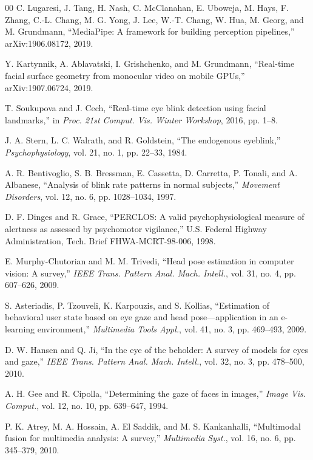 \documentclass[conference]{IEEEtran}
\begin{document}
\balance
\begin{thebibliography}{00}
 C. Lugaresi, J. Tang, H. Nash, C. McClanahan, E. Uboweja, M. Hays, F. Zhang, C.-L. Chang, M. G. Yong, J. Lee, W.-T. Chang, W. Hua, M. Georg, and M. Grundmann, ``MediaPipe: A framework for building perception pipelines,'' arXiv:1906.08172, 2019.

 Y. Kartynnik, A. Ablavatski, I. Grishchenko, and M. Grundmann, ``Real-time facial surface geometry from monocular video on mobile GPUs,'' arXiv:1907.06724, 2019.

 T. Soukupova and J. Cech, ``Real-time eye blink detection using facial landmarks,'' in \textit{Proc. 21st Comput. Vis. Winter Workshop}, 2016, pp. 1--8.

 J. A. Stern, L. C. Walrath, and R. Goldstein, ``The endogenous eyeblink,'' \textit{Psychophysiology}, vol. 21, no. 1, pp. 22--33, 1984.

 A. R. Bentivoglio, S. B. Bressman, E. Cassetta, D. Carretta, P. Tonali, and A. Albanese, ``Analysis of blink rate patterns in normal subjects,'' \textit{Movement Disorders}, vol. 12, no. 6, pp. 1028--1034, 1997.

 D. F. Dinges and R. Grace, ``PERCLOS: A valid psychophysiological measure of alertness as assessed by psychomotor vigilance,'' U.S. Federal Highway Administration, Tech. Brief FHWA-MCRT-98-006, 1998.

 E. Murphy-Chutorian and M. M. Trivedi, ``Head pose estimation in computer vision: A survey,'' \textit{IEEE Trans. Pattern Anal. Mach. Intell.}, vol. 31, no. 4, pp. 607--626, 2009.

 S. Asteriadis, P. Tzouveli, K. Karpouzis, and S. Kollias, ``Estimation of behavioral user state based on eye gaze and head pose---application in an e-learning environment,'' \textit{Multimedia Tools Appl.}, vol. 41, no. 3, pp. 469--493, 2009.

 D. W. Hansen and Q. Ji, ``In the eye of the beholder: A survey of models for eyes and gaze,'' \textit{IEEE Trans. Pattern Anal. Mach. Intell.}, vol. 32, no. 3, pp. 478--500, 2010.

 A. H. Gee and R. Cipolla, ``Determining the gaze of faces in images,'' \textit{Image Vis. Comput.}, vol. 12, no. 10, pp. 639--647, 1994.

 P. K. Atrey, M. A. Hossain, A. El Saddik, and M. S. Kankanhalli, ``Multimodal fusion for multimedia analysis: A survey,'' \textit{Multimedia Syst.}, vol. 16, no. 6, pp. 345--379, 2010.


\end{thebibliography}
\end{document}

